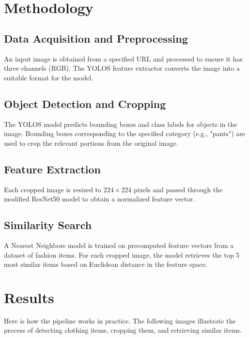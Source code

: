 \section*{Methodology}

\subsection*{Data Acquisition and Preprocessing}
An input image is obtained from a specified URL and processed to ensure it has three channels (RGB). The YOLOS feature extractor converts the image into a suitable format for the model.

\subsection*{Object Detection and Cropping}
The YOLOS model predicts bounding boxes and class labels for objects in the image. Bounding boxes corresponding to the specified category (e.g., "pants") are used to crop the relevant portions from the original image.

\subsection*{Feature Extraction}
Each cropped image is resized to $224 \times 224$ pixels and passed through the modified ResNet50 model to obtain a normalized feature vector.

\subsection*{Similarity Search}
A Nearest Neighbors model is trained on precomputed feature vectors from a dataset of fashion items. For each cropped image, the model retrieves the top 5 most similar items based on Euclidean distance in the feature space.

\section*{Results}

Here is how the pipeline works in practice. The following images illustrate the process of detecting clothing items, cropping them, and retrieving similar items.


